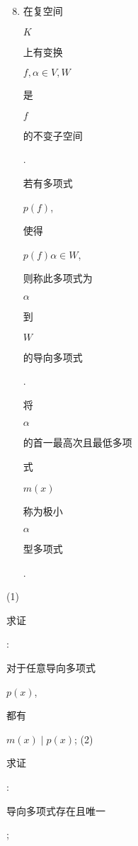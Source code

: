 \documentclass[10pt]{article}
\begin{document}
\begin{enumerate}
  \setcounter{enumi}{7}
  \item \begin{CJK}{UTF8}{mj}在复空间\end{CJK} $K$ \begin{CJK}{UTF8}{mj}上有变换\end{CJK} $f, \alpha \in V, W$ \begin{CJK}{UTF8}{mj}是\end{CJK} $f$ \begin{CJK}{UTF8}{mj}的不变子空间\end{CJK}. \begin{CJK}{UTF8}{mj}若有多项式\end{CJK} $p(f)$, \begin{CJK}{UTF8}{mj}使得\end{CJK} $p(f) \alpha \in W$, \begin{CJK}{UTF8}{mj}则称此多项式为\end{CJK} $\alpha$ \begin{CJK}{UTF8}{mj}到\end{CJK} $W$ \begin{CJK}{UTF8}{mj}的导向多项式\end{CJK}. \begin{CJK}{UTF8}{mj}将\end{CJK} $\alpha$ \begin{CJK}{UTF8}{mj}的首一最高次且最低多项\end{CJK} \begin{CJK}{UTF8}{mj}式\end{CJK} $m(x)$ \begin{CJK}{UTF8}{mj}称为极小\end{CJK} $\alpha$ \begin{CJK}{UTF8}{mj}型多项式\end{CJK}.
\end{enumerate}
(1) \begin{CJK}{UTF8}{mj}求证\end{CJK}: \begin{CJK}{UTF8}{mj}对于任意导向多项式\end{CJK} $p(x)$, \begin{CJK}{UTF8}{mj}都有\end{CJK} $m(x) \mid p(x)$; (2) \begin{CJK}{UTF8}{mj}求证\end{CJK}: \begin{CJK}{UTF8}{mj}导向多项式存在且唯一\end{CJK};
\end{document}
